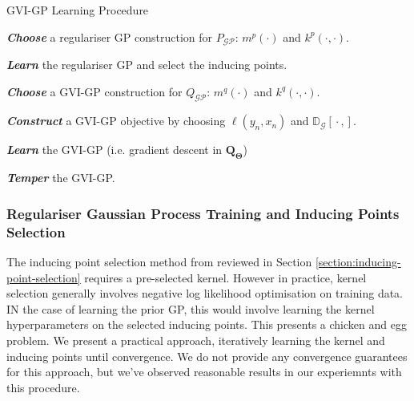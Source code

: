 \documentclass{article}
\newcommand{\GP}{\operatorname{\mathcal{GP}}}
\newcommand{\wc}{\operatorname{{}\cdot{}}}
\numberwithin{equation}{section}
\begin{document}
\begin{algorithm}
\caption{GVI-GP Learning Procedure}\label{alg:gvi-gp}
\begin{algorithmic}
    \item \textbf{\textit{Choose}} a regulariser GP construction for $P_{\GP}$: $m^p(\cdot)$ and $k^p(\cdot, \cdot)$.
    \item \textbf{\textit{Learn}} the regulariser GP and select the inducing points.
    \item \textbf{\textit{Choose}} a GVI-GP construction for $Q_{\GP}$: $m^q(\cdot)$ and $k^q(\cdot, \cdot)$.
    \item \textbf{\textit{Construct}} a GVI-GP objective by choosing $\ell(y_n, x_n)$ and $\mathbb{D}_{\mathcal{G}}\left[\wc, \right]$.
    \item \textbf{\textit{Learn}} the GVI-GP (i.e. gradient descent in $\boldsymbol{Q}_\boldsymbol{\Theta}$)
    \item \textbf{\textit{Temper}} the GVI-GP.
\end{algorithmic}
\end{algorithm}

\subsubsection{Regulariser Gaussian Process Training and Inducing Points Selection}
The inducing point selection method from \cite{burt2020convergence} reviewed in Section \ref{section:inducing-point-selection} requires a pre-selected kernel. However in practice, kernel selection generally involves negative log likelihood optimisation on training data. IN the case of learning the prior GP, this would involve learning the kernel hyperparameters on the selected inducing points. This presents a chicken and egg problem. We present a practical approach, iteratively learning the kernel and inducing points until convergence. We do not provide any convergence guarantees for this approach, but we've observed reasonable results in our experiemnts with this procedure. 
\end{document}
